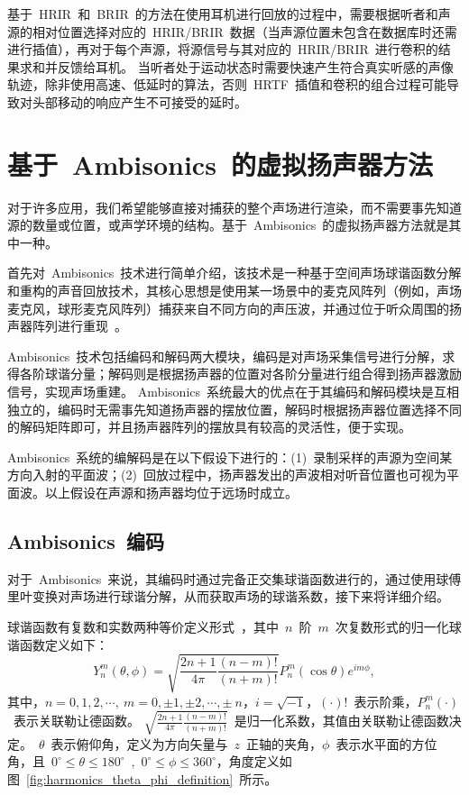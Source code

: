 基于~HRIR~和~BRIR~的方法在使用耳机进行回放的过程中，需要根据听者和声源的相对位置选择对应的~HRIR/BRIR~数据（当声源位置未包含在数据库时还需进行插值），再对于每个声源，将源信号与其对应的~HRIR/BRIR~进行卷积的结果求和并反馈给耳机。
当听者处于运动状态时需要快速产生符合真实听感的声像轨迹，除非使用高速、低延时的算法，否则~HRTF~插值和卷积的组合过程可能导致对头部移动的响应产生不可接受的延时。


\section{基于~Ambisonics~的虚拟扬声器方法}\label{section_Ambisonic_virtual_loudspeaker}

对于许多应用，我们希望能够直接对捕获的整个声场进行渲染，而不需要事先知道源的数量或位置，或声学环境的结构。基于~Ambisonics~的虚拟扬声器方法就是其中一种。

首先对~Ambisonics~技术进行简单介绍，该技术是一种基于空间声场球谐函数分解和重构的声音回放技术，其核心思想是使用某一场景中的麦克风阵列（例如，声场麦克风，球形麦克风阵列）捕获来自不同方向的声压波，并通过位于听众周围的扬声器阵列进行重现~。

Ambisonics~技术包括编码和解码两大模块，编码是对声场采集信号进行分解，求得各阶球谐分量；解码则是根据扬声器的位置对各阶分量进行组合得到扬声器激励信号，实现声场重建。
Ambisonics~系统最大的优点在于其编码和解码模块是互相独立的，编码时无需事先知道扬声器的摆放位置，解码时根据扬声器位置选择不同的解码矩阵即可，并且扬声器阵列的摆放具有较高的灵活性，便于实现。

Ambisonics~系统的编解码是在以下假设下进行的：(1)~录制采样的声源为空间某方向入射的平面波；(2)~回放过程中，扬声器发出的声波相对听音位置也可视为平面波。以上假设在声源和扬声器均位于远场时成立。


\subsection{Ambisonics~编码}

对于~Ambisonics~来说，其编码时通过完备正交集球谐函数进行的，通过使用球傅里叶变换对声场进行球谐分解，从而获取声场的球谐系数，接下来将详细介绍。

球谐函数有复数和实数两种等价定义形式~，其中~$n$~阶~$m$~次复数形式的归一化球谐函数定义如下：
\begin{equation}\label{qiuxiefushu}
Y_{n}^{m}(\theta,\phi) = \sqrt{\frac{2n+1}{4\pi}\frac{(n-m)!}{(n+m)!}}P_{n}^{m}(\cos\theta)e^{im\phi},
\end{equation}
其中，$n=0,1,2,\cdots,~m=0,\pm1,\pm2,\cdots,\pm~n$，$i=\sqrt{-1}$，$(\cdot)!$~表示阶乘，$P_{n}^{m}(\cdot)$~表示关联勒让德函数。
$\sqrt{\frac{2n+1}{4\pi}\frac{(n-m)!}{(n+m)!}}$~是归一化系数，其值由关联勒让德函数决定。~$\theta$~表示俯仰角，定义为方向矢量与~$z$~正轴的夹角，$\phi$~表示水平面的方位角，且~$0^{\circ}\le\theta\le180^{\circ}$~,~$0^{\circ}\le\phi\le360^{\circ}$，角度定义如图~\ref{fig:harmonics_theta_phi_definition}~所示。


